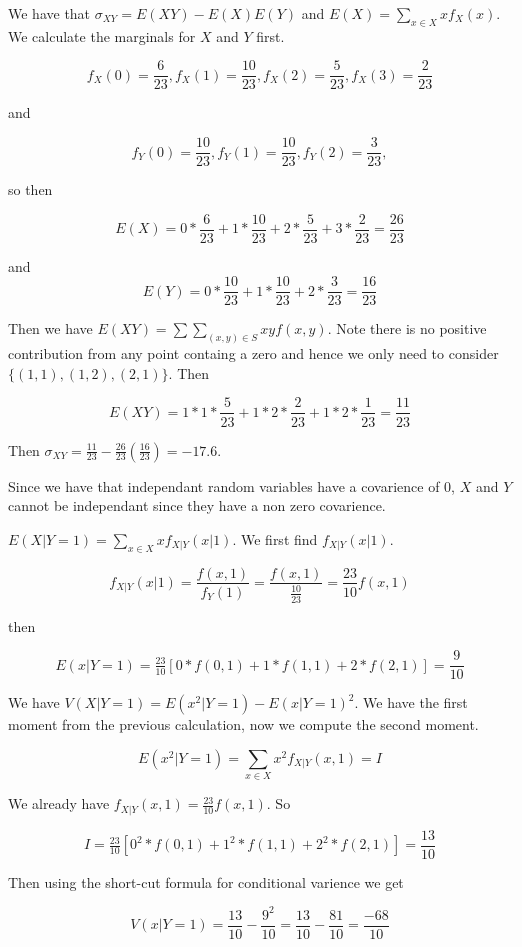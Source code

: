 \documentclass[11pt,largemargins]{homework}
\begin{document}
\maketitle

\question
We have that $\sigma_{XY} = E(XY) -E(X)E(Y) $ and $E(X) = \sum_{x \in X} x f_X(x)$. We calculate the marginals for $X$ and $Y$ first. 

\[f_X(0) = \frac{6}{23},f_X(1) = \frac{10}{23}, f_X(2) = \frac{5}{23}, f_X(3) = \frac{2}{23} \]

and 

\[ f_Y(0) = \frac{10}{23}, f_Y(1) = \frac{10}{23}, f_Y(2) = \frac{3}{23}, \]

so then 

\[E(X) = 0 * \frac{6}{23} + 1 * \frac{10}{23} + 2 * \frac{5}{23} + 3*\frac{2}{23} = \frac{26}{23} \] 

and 
\[E(Y) = 0 * \frac{10}{23} + 1 * \frac{10}{23} + 2 * \frac{3}{23} = \frac{16}{23} \] 

Then we have $E(XY) = \sum \sum_{(x, y) \in S} xyf(x, y)$. Note there is no positive contribution from any point containg a zero and 
hence we only need to consider $\{(1,1), (1,2), (2,1) \}$. Then 

\[E(XY) = 1*1*\frac{5}{23} +  1*2*\frac{2}{23} +  1*2*\frac{1}{23} = \frac{11}{23} \] 

Then $\sigma_{XY} = \frac{11}{23} - \frac{26}{23}(\frac{16}{23}) = -17.6 $. 

\question
Since we have that independant random variables have a covarience of 0, $X$ and $Y$ cannot be independant since they have 
a non zero covarience. 

\question 
$E(X | Y = 1) = \sum_{x \in X} x f_{X|Y}(x | 1)$. We first find $f_{X|Y}(x |1)$.

\[f_{X|Y}(x |1) = \frac{f(x, 1)}{f_Y(1)} = \frac{f(x, 1)}{\frac{10}{23}} = \frac{23}{10}f(x, 1) \] 

then 

\[E(x |Y = 1) = \tfrac{23}{10}[0*f(0,1) + 1*f(1,1) + 2*f(2,1) ] = \frac{9}{10} \] 

\question 
We have $V(X | Y = 1) = E(x^2 | Y = 1) - E(x | Y = 1)^2$. We have the first moment from the previous calculation, now we compute 
the second moment. 

\[ E(x^2 | Y = 1) = \sum_{x \in X} x^2 f_{X|Y}(x, 1) = I \] 

We already have $f_{X|Y}(x, 1) = \frac{23}{10}f(x, 1)$. So

\[ I =\tfrac{23}{10}[0^2*f(0,1) + 1^2*f(1,1) + 2^2*f(2,1)] = \frac{13}{10}   \] 

Then using the short-cut formula for conditional varience we get 

\[V(x | Y = 1) = \frac{13}{10} - \frac{9^2}{10} = \frac{13}{10} - \frac{81}{10} = \frac{-68}{10}\]
\end{document}
